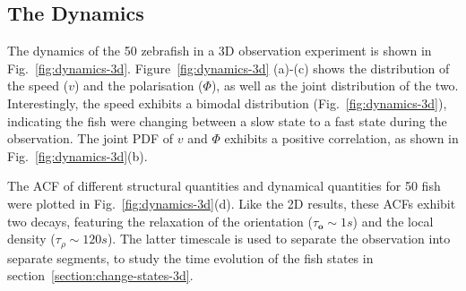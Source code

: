 \documentclass[11pt,twoside]{report}
\begin{document}
\subsection{The Dynamics}


The dynamics of the 50 zebrafish in a 3D observation experiment is shown in Fig.~\ref{fig:dynamics-3d}. Figure~\ref{fig:dynamics-3d} (a)-(c) shows the distribution of the speed ($v$) and the polarisation ($\Phi$), as well as the joint distribution of the two. Interestingly, the speed exhibits a bimodal distribution (Fig.~\ref{fig:dynamics-3d}), indicating the fish were changing between a slow state to a fast state during the observation. The joint PDF of $v$ and $\Phi$ exhibits a positive correlation, as shown in Fig.~\ref{fig:dynamics-3d}(b).


The ACF of different structural quantities and dynamical quantities for 50 fish were plotted in Fig.~\ref{fig:dynamics-3d}(d). Like the 2D results, these ACFs exhibit two decays, featuring the relaxation of the orientation ($\tau_\mathbf{o} \sim 1s$) and the local density ($\tau_\rho \sim 120s$). The latter timescale is used to separate the observation into separate segments, to study the time evolution of the fish states in section~\ref{section:change-states-3d}.
\end{document}

